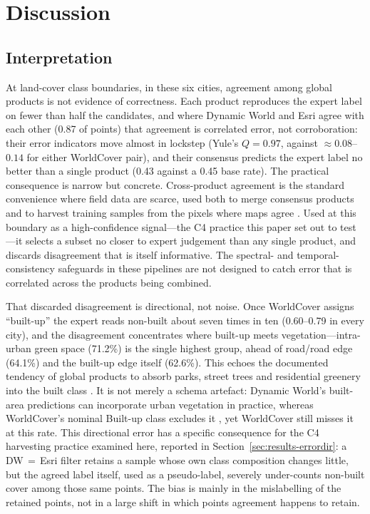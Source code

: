 \documentclass[remotesensing,article,submit,moreauthors]{Definitions/mdpi}
\begin{document}
\section{Discussion}\label{sec:discussion}

\subsection{Interpretation}\label{sec:disc-arbitrate}

At land-cover class boundaries, in these six cities, agreement among
global products is not evidence of correctness. Each product reproduces the
expert label on fewer than half the candidates, and where Dynamic World and
Esri agree with each other (0.87 of points) that agreement is correlated error,
not corroboration: their error indicators move almost in lockstep (Yule's
$Q = 0.97$, against $\approx 0.08$--$0.14$ for either WorldCover pair), and their consensus
predicts the expert label no better than a single product (0.43 against a 0.45
base rate). The practical consequence is narrow but concrete. Cross-product
agreement is the standard convenience where field data are scarce, used both to
merge consensus products \citep{tuanmu2014} and to harvest training samples
from the pixels where maps agree \citep{zhangroy2017,wang2024a}. Used at this
boundary as a high-confidence signal---the C4 practice this paper set out to
test---it selects a subset no closer to expert judgement than any single
product, and discards disagreement that is itself informative. The spectral-
and temporal-consistency safeguards in these pipelines are not designed to
catch error that is correlated across the products being combined.

That discarded disagreement is directional, not noise\label{sec:disc-edge}.
Once WorldCover assigns ``built-up'' the expert reads non-built about seven
times in ten (0.60--0.79 in every city), and the disagreement concentrates
where built-up meets vegetation---intra-urban green space (71.2\%) is the
single highest group, ahead of road/road edge (64.1\%) and the built-up edge
itself (62.6\%). This echoes the documented
tendency of global products to absorb parks, street trees and residential
greenery into the built class \citep{yuan2026,xu2024}. It is not merely a
schema artefact: Dynamic World's built-area predictions can incorporate urban
vegetation in practice, whereas WorldCover's nominal Built-up class
excludes it \citep{venter2022}, yet
WorldCover still misses it at this rate. This directional error has a specific
consequence for the C4 harvesting practice examined here, reported in
Section~\ref{sec:results-errordir}: a DW\,$=$\,Esri filter retains a sample
whose own class composition changes little, but the agreed label itself, used
as a pseudo-label, severely under-counts non-built cover among those same
points. The bias is mainly
in the mislabelling of the retained points, not in a large shift in which
points agreement happens to retain.
\end{document}
